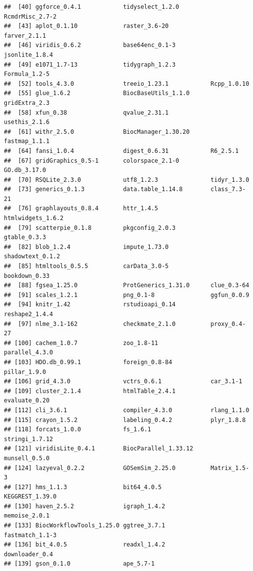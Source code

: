 \documentclass[9pt,a4paper,]{extarticle}
\begin{document}
\begin{verbatim}
##  [40] ggforce_0.4.1            tidyselect_1.2.0         RcmdrMisc_2.7-2         
##  [43] aplot_0.1.10             raster_3.6-20            farver_2.1.1            
##  [46] viridis_0.6.2            base64enc_0.1-3          jsonlite_1.8.4          
##  [49] e1071_1.7-13             tidygraph_1.2.3          Formula_1.2-5           
##  [52] tools_4.3.0              treeio_1.23.1            Rcpp_1.0.10             
##  [55] glue_1.6.2               BiocBaseUtils_1.1.0      gridExtra_2.3           
##  [58] xfun_0.38                qvalue_2.31.1            usethis_2.1.6           
##  [61] withr_2.5.0              BiocManager_1.30.20      fastmap_1.1.1           
##  [64] fansi_1.0.4              digest_0.6.31            R6_2.5.1                
##  [67] gridGraphics_0.5-1       colorspace_2.1-0         GO.db_3.17.0            
##  [70] RSQLite_2.3.0            utf8_1.2.3               tidyr_1.3.0             
##  [73] generics_0.1.3           data.table_1.14.8        class_7.3-21            
##  [76] graphlayouts_0.8.4       httr_1.4.5               htmlwidgets_1.6.2       
##  [79] scatterpie_0.1.8         pkgconfig_2.0.3          gtable_0.3.3            
##  [82] blob_1.2.4               impute_1.73.0            shadowtext_0.1.2        
##  [85] htmltools_0.5.5          carData_3.0-5            bookdown_0.33           
##  [88] fgsea_1.25.0             ProtGenerics_1.31.0      clue_0.3-64             
##  [91] scales_1.2.1             png_0.1-8                ggfun_0.0.9             
##  [94] knitr_1.42               rstudioapi_0.14          reshape2_1.4.4          
##  [97] nlme_3.1-162             checkmate_2.1.0          proxy_0.4-27            
## [100] cachem_1.0.7             zoo_1.8-11               parallel_4.3.0          
## [103] HDO.db_0.99.1            foreign_0.8-84           pillar_1.9.0            
## [106] grid_4.3.0               vctrs_0.6.1              car_3.1-1               
## [109] cluster_2.1.4            htmlTable_2.4.1          evaluate_0.20           
## [112] cli_3.6.1                compiler_4.3.0           rlang_1.1.0             
## [115] crayon_1.5.2             labeling_0.4.2           plyr_1.8.8              
## [118] forcats_1.0.0            fs_1.6.1                 stringi_1.7.12          
## [121] viridisLite_0.4.1        BiocParallel_1.33.12     munsell_0.5.0           
## [124] lazyeval_0.2.2           GOSemSim_2.25.0          Matrix_1.5-3            
## [127] hms_1.1.3                bit64_4.0.5              KEGGREST_1.39.0         
## [130] haven_2.5.2              igraph_1.4.2             memoise_2.0.1           
## [133] BiocWorkflowTools_1.25.0 ggtree_3.7.1             fastmatch_1.1-3         
## [136] bit_4.0.5                readxl_1.4.2             downloader_0.4          
## [139] gson_0.1.0               ape_5.7-1
\end{verbatim}
\end{document}
